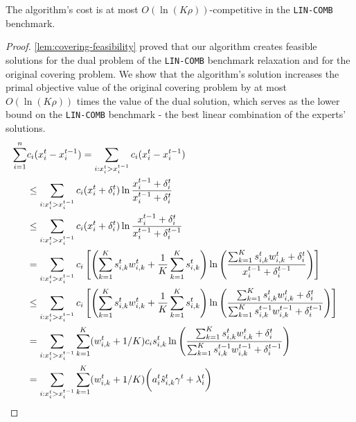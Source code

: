 \clearpage

\begin{theorem} \label{covering-theorem}
The algorithm's cost is at most $O(\ln(K \rho))$-competitive in the \texttt{LIN-COMB} benchmark.
\end{theorem}
%
\begin{proof} \cref{lem:covering-feasibility} proved that our algorithm creates feasible solutions for the dual problem of the \texttt{LIN-COMB} benchmark relaxation and for the original covering problem. We show that the algorithm's solution increases the primal objective value of the original covering problem by at most $O(\ln(K \rho))$ times the value of the dual solution, which serves as the lower bound on the \texttt{LIN-COMB} benchmark - the best linear combination of the experts' solutions.
\begin{align}
	 \sum_{i=1}^{n} &c_{i} (x_{i}^{t} - x_{i}^{t-1})
		= \sum_{i: x_{i}^{t} > x_{i}^{t-1}} c_{i}(x_{i}^{t} - x_{i}^{t-1}) &&  \notag \\
		&\leq \sum_{i: x_{i}^{t} > x_{i}^{t-1}} c_{i}(x_{i}^{t} + \delta_{i}^{t}) \ln \frac{x_{i}^{t-1} + \delta_{i}^{t}}{x_{i}^{t-1} + \delta_{i}^{t}} \\
		&\leq \sum_{i: x_{i}^{t} > x_{i}^{t-1}} c_{i} (x_{i}^{t} + \delta_{i}^{t}) \ln \frac{x_{i}^{t-1} + \delta_{i}^{t}}{x_{i}^{t-1} + \delta_{i}^{t-1}} \\
		&= \sum_{i: x_{i}^{t} > x_{i}^{t-1}} c_{i} \left[ \left(\sum_{k=1}^{K}  s_{i,k}^{t} w_{i,k}^{t} + \frac{1}{K} \sum_{k=1}^{K} s_{i,k}^{t} \right)
			\ln \left(\frac{ \sum_{k=1}^{K}  s_{i,k}^{t} w_{i,k}^{t} + \delta_{i}^{t}}{x_{i}^{t-1} + \delta_{i}^{t-1}}  \right) \right] \\
%
&\leq \sum_{i: x_{i}^{t} > x_{i}^{t-1}} c_{i} \left[ \left(\sum_{k=1}^{K}  s_{i,k}^{t} w_{i,k}^{t} + \frac{1}{K} \sum_{k=1}^{K} s_{i,k}^{t} \right)
			\ln \left(\frac{ \sum_{k=1}^{K}  s_{i,k}^{t} w_{i,k}^{t} + \delta_{i}^{t}}{\sum_{k=1}^{K}  s_{i,k}^{t-1} w_{i,k}^{t-1} + \delta_{i}^{t-1}}  \right) \right]\\
%
	&= \sum_{i: x_{i}^{t} > x_{i}^{t-1}} \sum_{k=1}^{K} (w_{i,k}^{t} + 1/K) c_{i} s_{i,k}^{t}
				\ln \left(\frac{ \sum_{k=1}^{K} s_{i,k}^{t} w_{i,k}^{t}  + \delta_{i}^{t}}{\sum_{k=1}^{K}  s_{i,k}^{t-1} w_{i,k}^{t-1}  + \delta_{i}^{t-1}}  \right) \notag \\
%
%
&=  \sum_{i: x_{i}^{t} > x_{i}^{t-1}} \sum_{k=1}^{K} (w_{i,k}^{t} + 1/K) \biggl( a_{i}^{t} \hat{s}_{i,k}^{t} \gamma^t + \lambda_{i}^{t} \biggr) \\

\end{align}
\end{proof}
